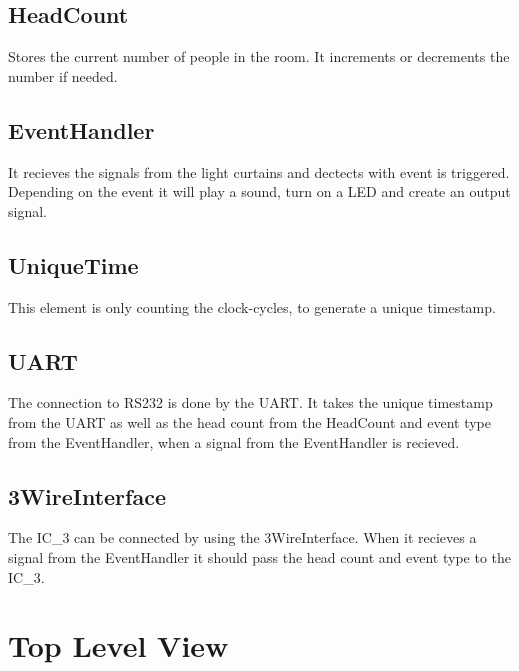 \documentclass[12pt,a4 paper] {article}
\begin{document}
\subsection*{HeadCount}
Stores the current number of people in the room. It increments or decrements the number if needed.
\subsection*{EventHandler}
It recieves the signals from the light curtains and dectects with event is triggered. Depending on the event it will play a sound, turn on a LED and create an output signal.
\subsection*{UniqueTime}
This element is only counting the clock-cycles, to generate a unique timestamp. \newpage
\subsection*{UART}
The connection to RS232 is done by the UART. It takes the unique timestamp from the UART as well as the head count from the HeadCount and event type from the EventHandler, when a signal from the EventHandler is recieved.
\subsection*{3WireInterface}
The IC\_3 can be connected by using the 3WireInterface. When it recieves a signal from the EventHandler it should pass the head count and event type to the IC\_3.

\section{Top Level View}
\end{document}
